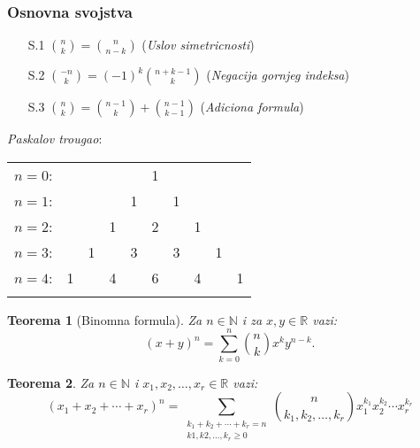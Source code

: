 \documentclass[12p, a4paper]{article}
\newtheorem*{theorem}{Teorema}
\begin{document}
\begin{multicols}{2}
    \subsubsection{Osnovna svojstva}

    \begin{enumerate}
        \itemsep0em
        \item [S.1] $\binom{n}{k} = \binom{n}{n - k}$ 
                    (\emph{Uslov simetricnosti})
        \item [S.2] $\binom{-n}{k} = {(-1)}^k \binom{n + k - 1}{k}$
                    (\emph{Negacija gornjeg indeksa})
        \item [S.3] $\binom{n}{k} = \binom{n - 1}{k} + \binom{n - 1}{k - 1}$
                    (\emph{Adiciona formula})
    \end{enumerate}
    
    \emph{Paskalov trougao}:

    \begin{tabular}{rccccccccc}
        $n=0$:&    &    &    &    &  1\\
            \noalign{\smallskip\smallskip}
        $n=1$:&    &    &    &  1 &    &  1\\
            \noalign{\smallskip\smallskip}
        $n=2$:&    &    &  1 &    &  2 &    &  1\\
            \noalign{\smallskip\smallskip}
        $n=3$:&    &  1 &    &  3 &    &  3 &    &  1\\
            \noalign{\smallskip\smallskip}
        $n=4$:&  1 &    &  4 &    &  6 &    &  4 &    &  1\\
            \noalign{\smallskip\smallskip}
    \end{tabular}

    \begin{theorem}[Binomna formula]
        Za $n \in \mathbb{N}$ i za 
        $x, y \in \mathbb{R}$ vazi:
        \[
            {(x + y)}^n = \sum_{k = 0}^n \binom{n}{k} x^k y^{n - k}.
        \]
    \end{theorem}

    \begin{theorem}
        Za $n \in \mathbb{N}$ i $x_1, x_2, \ldots, x_r \in \mathbb{R}$ vazi:
        \[
            {(x_1 + x_2 + \cdots + x_r)}^n = 
            \sum_{\substack{k_1 + k_2 + \cdots + k_r = n \\ 
                  k1, k2, \ldots, k_r \geq 0}}
            \binom{n}{k_1, k_2, \ldots, k_r} 
            x_1^{k_1} x_2^{k_2} \cdots x_r^{k_r}
        \]
    \end{theorem}


\end{multicols}
\end{document}
